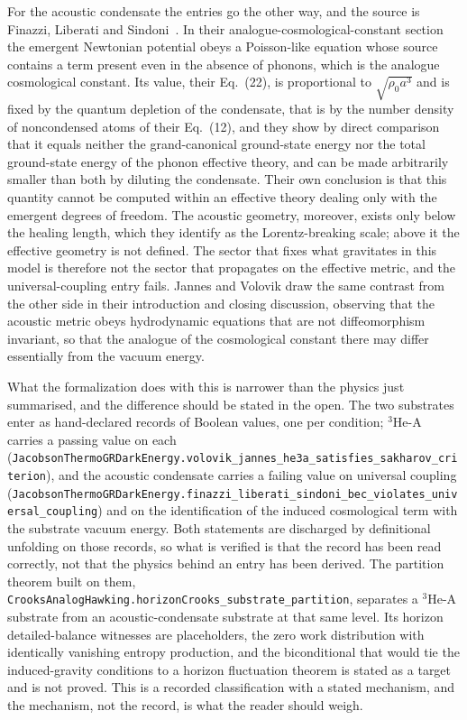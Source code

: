 \documentclass[aps,prd,nofootinbib,superscriptaddress,12pt]{revtex4-2}
\DeclareRobustCommand{\lb}{\discretionary{}{}{}}
\begin{document}
For the acoustic condensate the entries go the other way, and the source is
Finazzi, Liberati and Sindoni~\cite{FinazziLiberatiSindoni2012}. In their
analogue-cosmological-constant section the emergent Newtonian potential obeys a
Poisson-like equation whose source contains a term present even in the absence
of phonons, which is the analogue cosmological constant. Its value, their
Eq.~(22), is proportional to $\sqrt{\rho_0 a^3}$ and is fixed by the quantum
depletion of the condensate, that is by the number density of noncondensed
atoms of their Eq.~(12), and they show by direct comparison that it equals
neither the grand-canonical ground-state energy nor the total ground-state
energy of the phonon effective theory, and can be made arbitrarily smaller than
both by diluting the condensate. Their own conclusion is that this quantity
cannot be computed within an effective theory dealing only with the emergent
degrees of freedom. The acoustic geometry, moreover, exists only below the
healing length, which they identify as the Lorentz-breaking scale; above it the
effective geometry is not defined. The sector that fixes what gravitates in
this model is therefore not the sector that propagates on the effective metric,
and the universal-coupling entry fails. Jannes and Volovik draw the same
contrast from the other side in their introduction and closing discussion,
observing that the acoustic metric obeys hydrodynamic equations that are not
diffeomorphism invariant, so that the analogue of the cosmological constant
there may differ essentially from the vacuum energy.

What the formalization does with this is narrower than the physics just
summarised, and the difference should be stated in the open. The two substrates
enter as hand-declared records of Boolean values, one per condition;
$^{3}$He-A carries a passing value on each
(\texttt{Jacobson\lb{}Thermo\lb{}GRDark\lb{}Energy.\lb{}volovik\_\lb{}jannes\_\lb{}he3a\_\lb{}satisfies\_\lb{}sakharov\_\lb{}criterion}),
and the acoustic condensate carries a failing value on universal coupling
(\texttt{Jacobson\lb{}Thermo\lb{}GRDark\lb{}Energy.\lb{}finazzi\_\lb{}liberati\_\lb{}sindoni\_\lb{}bec\_\lb{}violates\_\lb{}universal\_\lb{}coupling})
and on the identification of the induced cosmological term with the substrate
vacuum energy. Both statements are discharged by definitional unfolding on
those records, so what is verified is that the record has been read correctly,
not that the physics behind an entry has been derived. The partition theorem
built on them,
\texttt{Crooks\lb{}Analog\lb{}Hawking.\lb{}horizon\lb{}Crooks\_\lb{}substrate\_\lb{}partition}, separates a
$^{3}$He-A substrate from an acoustic-condensate substrate at that same level.
Its horizon detailed-balance witnesses are placeholders, the zero work
distribution with identically vanishing entropy production, and the
biconditional that would tie the induced-gravity conditions to a horizon
fluctuation theorem is stated as a target and is not proved. This is a recorded
classification with a stated mechanism, and the mechanism, not the record, is
what the reader should weigh.
\end{document}
